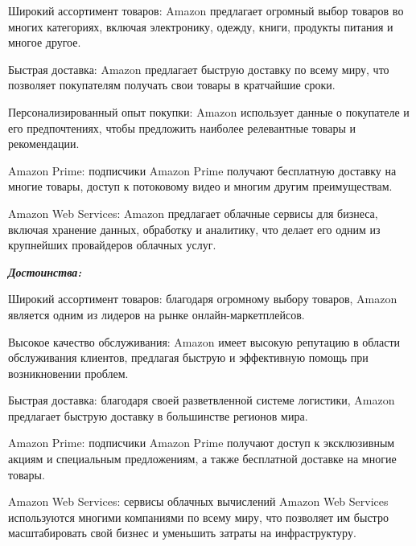 \begin{compactitem}
    \item  Широкий ассортимент товаров: Amazon предлагает огромный выбор товаров во многих категориях, включая электронику, одежду, книги, продукты питания и многое другое.

    \item  Быстрая доставка: Amazon предлагает быструю доставку по всему миру, что позволяет покупателям получать свои товары в кратчайшие сроки.

    \item  Персонализированный опыт покупки: Amazon использует данные о покупателе и его предпочтениях, чтобы предложить наиболее релевантные товары и рекомендации.

    \item Amazon Prime: подписчики Amazon Prime получают бесплатную доставку на многие товары, доступ к потоковому видео и многим другим преимуществам.

    \item  Amazon Web Services: Amazon предлагает облачные сервисы для бизнеса, включая хранение данных, обработку и аналитику, что делает его одним из крупнейших провайдеров облачных услуг.
\end{compactitem}

\textbf{\emph{Достоинства:}}

\begin{compactitem}
    \item  Широкий ассортимент товаров: благодаря огромному выбору товаров, Amazon является одним из лидеров на рынке онлайн-маркетплейсов.

    \item  Высокое качество обслуживания: Amazon имеет высокую репутацию в области обслуживания клиентов, предлагая быструю и эффективную помощь при возникновении проблем.

    \item  Быстрая доставка: благодаря своей разветвленной системе логистики, Amazon предлагает быструю доставку в большинстве регионов мира.

    \item  Amazon Prime: подписчики Amazon Prime получают доступ к эксклюзивным акциям и специальным предложениям, а также бесплатной доставке на многие товары.

    \item  Amazon Web Services: сервисы облачных вычислений Amazon Web Services используются многими компаниями по всему миру, что позволяет им быстро масштабировать свой бизнес и уменьшить затраты на инфраструктуру.
\end{compactitem}

